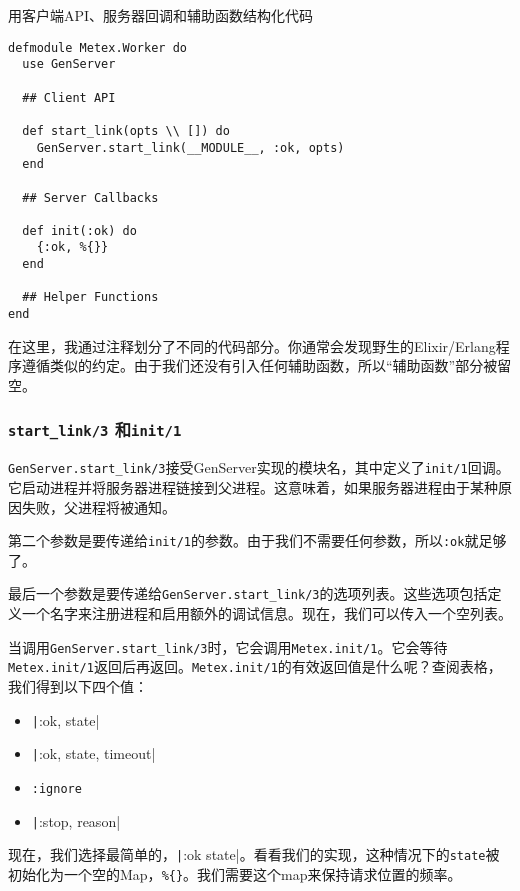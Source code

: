 \begin{code}{用客户端API、服务器回调和辅助函数结构化代码}
\begin{verbatim}
defmodule Metex.Worker do
  use GenServer

  ## Client API

  def start_link(opts \\ []) do
    GenServer.start_link(__MODULE__, :ok, opts)
  end

  ## Server Callbacks

  def init(:ok) do
    {:ok, %{}}
  end

  ## Helper Functions
end
\end{verbatim}
\label{lst:structure_code}
\end{code}

在这里，我通过注释划分了不同的代码部分。你通常会发现野生的Elixir/Erlang程序遵循类似的约定。由于我们还没有引入任何辅助函数，所以``辅助函数''部分被留空。

\subsubsection{\texttt{start\_link/3} 和\texttt{init/1}}

\texttt{GenServer.start\_link/3}接受GenServer实现的模块名，其中定义了\texttt{init/1}回调。它启动进程并将服务器进程链接到父进程。这意味着，如果服务器进程由于某种原因失败，父进程将被通知。

第二个参数是要传递给\texttt{init/1}的参数。由于我们不需要任何参数，所以\texttt{:ok}就足够了。

最后一个参数是要传递给\texttt{GenServer.start\_link/3}的选项列表。这些选项包括定义一个名字来注册进程和启用额外的调试信息。现在，我们可以传入一个空列表。

当调用\texttt{GenServer.start\_link/3}时，它会调用\texttt{Metex.init/1}。它会等待\texttt{Metex.init/1}返回后再返回。\texttt{Metex.init/1}的有效返回值是什么呢？查阅表格，我们得到以下四个值：

\begin{itemize}

\item  \texttt|{:ok, state}|
\item  \texttt|{:ok, state, timeout}|
\item  \texttt{:ignore}
\item  \texttt|{:stop, reason}|
\end{itemize}

现在，我们选择最简单的，\texttt|{:ok state}|。看看我们的实现，这种情况下的\texttt{state}被初始化为一个空的Map，\texttt{\%\{\}}。我们需要这个map来保持请求位置的频率。


